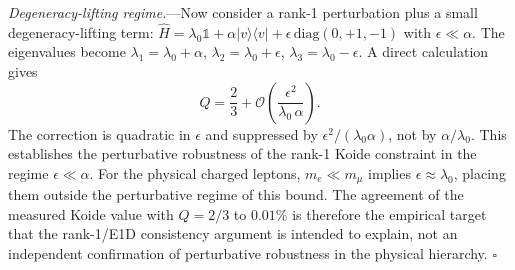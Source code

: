 \documentclass[aps,prd,onecolumn,superscriptaddress,nofootinbib,showpacs,12pt,notitlepage]{revtex4-2}
\begin{document}
\textit{Degeneracy-lifting regime.}---Now
consider a rank-1 perturbation plus a small
degeneracy-lifting term:
$\hat{H} = \lambda_{0}\mathbb{1}
+ \alpha|v\rangle\langle v|
+ \epsilon\,\mathrm{diag}(0, +1, -1)$
with $\epsilon \ll \alpha$.  The eigenvalues become
$\lambda_{1} = \lambda_{0}+\alpha$,
$\lambda_{2} = \lambda_{0}+\epsilon$,
$\lambda_{3} = \lambda_{0}-\epsilon$.  A direct
calculation gives
\begin{equation}\label{eq:Q_lifted}
  Q = \frac{2}{3}
  + \mathcal{O}\!\left(\frac{\epsilon^{2}}
    {\lambda_{0}\,\alpha}\right).
\end{equation}
The correction is quadratic in $\epsilon$ and suppressed by
$\epsilon^{2}/(\lambda_{0}\alpha)$, not by $\alpha/\lambda_{0}$.
This establishes the perturbative robustness of the rank-1
Koide constraint in the regime $\epsilon \ll \alpha$.
For the physical charged leptons, $m_{e} \ll m_{\mu}$ implies
$\epsilon \approx \lambda_{0}$, placing them outside the
perturbative regime of this bound.  The agreement of the
measured Koide value with $Q=2/3$ to $0.01\%$ is therefore
the empirical target that the rank-1/E1D consistency argument
is intended to explain, not an independent confirmation of
perturbative robustness in the physical hierarchy.
\hfill $\square$

\end{document}

